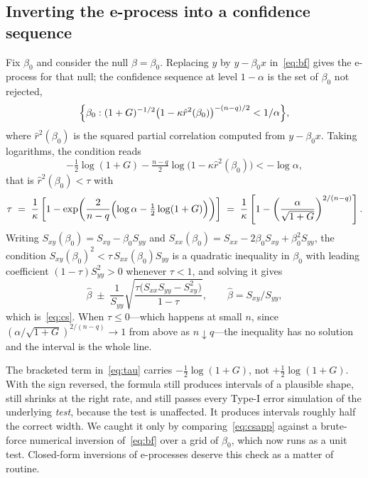 \begin{appendices}
\section{Inverting the e-process into a confidence sequence}\label{app:cs}

Fix $\beta_0$ and consider the null $\beta = \beta_0$. Replacing $y$ by
$y - \beta_0 x$ in~\eqref{eq:bf} gives the e-process for that null; the
confidence sequence at level $1-\alpha$ is the set of $\beta_0$ not rejected,
\begin{equation*}
\Bigl\{ \beta_0 :
  (1+G)^{-1/2}\bigl(1 - \kappa \hat r^2(\beta_0)\bigr)^{-(n-q)/2}
  < 1/\alpha \Bigr\},
\end{equation*}
where $\hat r^2(\beta_0)$ is the squared partial correlation computed from
$y - \beta_0 x$. Taking logarithms, the condition reads
\begin{equation*}
-\tfrac12 \log(1+G) - \tfrac{n-q}{2}\log\bigl(1 - \kappa\hat r^2(\beta_0)\bigr)
  < -\log\alpha ,
\end{equation*}
that is $\hat r^2(\beta_0) < \tau$ with
\begin{equation}\label{eq:tau}
\tau \;=\; \frac{1}{\kappa}
  \left[ 1 - \exp\!\left( \frac{2}{n-q}
    \Bigl( \log\alpha - \tfrac12\log(1+G) \Bigr) \right) \right]
\;=\; \frac{1}{\kappa}
  \left[ 1 - \left(\frac{\alpha}{\sqrt{1+G}}\right)^{2/(n-q)} \right].
\end{equation}
Writing $S_{xy}(\beta_0) = S_{xy} - \beta_0 S_{yy}$ and
$S_{xx}(\beta_0) = S_{xx} - 2\beta_0 S_{xy} + \beta_0^2 S_{yy}$, the condition
$S_{xy}(\beta_0)^2 < \tau\, S_{xx}(\beta_0) S_{yy}$ is a quadratic inequality
in $\beta_0$ with leading coefficient $(1-\tau)S_{yy}^2 > 0$ whenever
$\tau < 1$, and solving it gives
\begin{equation}\label{eq:csapp}
\hat\beta \;\pm\; \frac{1}{S_{yy}}
  \sqrt{\frac{\tau\bigl(S_{xx}S_{yy} - S_{xy}^2\bigr)}{1-\tau}},
\qquad \hat\beta = S_{xy}/S_{yy},
\end{equation}
which is~\eqref{eq:cs}. When $\tau \le 0$---which happens at small $n$, since
$(\alpha/\sqrt{1+G})^{2/(n-q)} \to 1$ from above as $n \downarrow q$---the
inequality has no solution and the interval is the whole line.

\begin{remark}
The bracketed term in~\eqref{eq:tau} carries $-\tfrac12\log(1+G)$, not
$+\tfrac12\log(1+G)$. With the sign reversed, the formula still produces
intervals of a plausible shape, still shrinks at the right rate, and still
passes every Type-I error simulation of the underlying \emph{test}, because
the test is unaffected. It produces intervals roughly half the correct width.
We caught it only by comparing~\eqref{eq:csapp} against a brute-force
numerical inversion of~\eqref{eq:bf} over a grid of $\beta_0$, which now runs
as a unit test. Closed-form inversions of e-processes deserve this check as a
matter of routine.
\end{remark}


\end{appendices}
